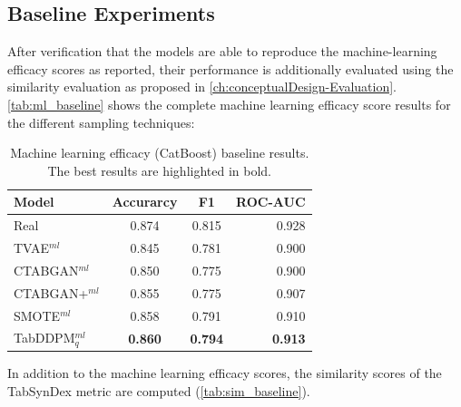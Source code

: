 \subsection{Baseline Experiments}
\label{ch:Baseline}

After verification that the models are able to reproduce the machine-learning efficacy scores as reported,
their performance is additionally evaluated using the similarity evaluation as proposed in \autoref{ch:conceptualDesign-Evaluation}.
\autoref{tab:ml_baseline} shows the complete machine learning efficacy score results for the different sampling techniques:

\begin{table}[h]
	\centering
	\begin{tabular}{lccr}
		\toprule
		\textbf{Model}     & \textbf{Accurarcy} & \textbf{F1}    & \textbf{ROC-AUC} \\ 
		\midrule
		Real               & 0.874              & 0.815          & 0.928            \\ 
		TVAE$^{ml}$        & 0.845              & 0.781          & 0.900            \\ 
		CTABGAN$^{ml}$     & 0.850              & 0.775          & 0.900            \\ 
		CTABGAN+$^{ml}$    & 0.855              & 0.775          & 0.907            \\ 
		SMOTE$^{ml}$       & 0.858              & 0.791          & 0.910            \\ 
		TabDDPM$^{ml}_{q}$ & \textbf{0.860}     & \textbf{0.794} & \textbf{0.913}   \\ 
		\bottomrule
	\end{tabular}
	\caption[ML-efficacy Baseline]{Machine learning efficacy (CatBoost) baseline results. The best results are highlighted in bold.}
	\label{tab:ml_baseline}
\end{table}


In addition to the machine learning efficacy scores, the similarity scores of the TabSynDex metric are computed (\autoref{tab:sim_baseline}).

